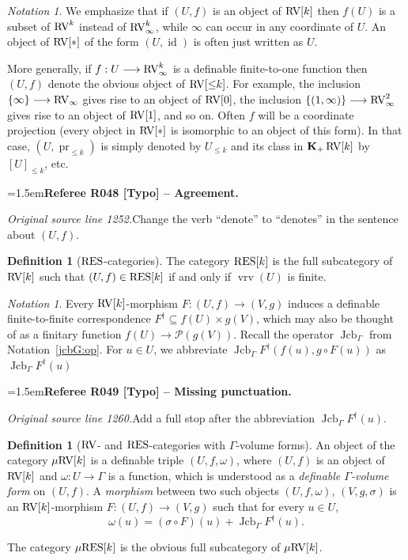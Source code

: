 \documentclass[12pt]{amsart}
\newcommand{\RefereeRemark}[4]{%
  \par\medskip\begingroup\normalfont\small\color{RefereePurple}%
  \emergencystretch=1.5em\noindent\textbf{Referee R#1 [#2] -- #3.}\par\nobreak\noindent #4\par
  \endgroup\medskip
}
\newcommand{\memph}[1]{{\color{magenta}\emph{#1}}}
\theoremstyle{plain}
\theoremstyle{definition}
\newtheorem{defn}[thm]{Definition}
\theoremstyle{remark}
\newtheorem{nota}[thm]{Notation}
\numberwithin{equation}{section}
\theoremstyle{plain}
\newcommand{\RV}{\textup{RV}}
\DeclareMathOperator{\id}{id}
\DeclareMathOperator{\pr}{pr}
\DeclareMathOperator{\jcb}{Jcb}
\newcommand{\0}{\emptyset}
\newcommand{\mdl}[1]{\mathcal{#1}}  %
\newcommand{\fun}{\longrightarrow}
\newcommand{\sub}{\subseteq}
\newcommand{\mgRV}{{\mu}{\RV}}
\newcommand{\RES}{\textup{RES}}
\newcommand{\mgRES}{{\mu}{\RES}}
\DeclareMathOperator{\gsk}{\mathbf{K}_+}
\DeclareMathOperator{\vrv}{vrv}
\begin{document}
\begin{nota}\label{0coor}
We emphasize that if $(U, f)$ is an object of $\RV[k]$ then $f(U)$ is a subset of $\RV^k$ instead of $\RV^k_\infty$, while $\infty$ can occur in any coordinate of $U$. An object of  $\RV[*]$ of the form $(U, \id)$ is often just written as $U$.

More generally, if $f : U \fun \RV_\infty^k$ is a definable finite-to-one function then $(U, f)$ denote the obvious object of $\RV[{\leq} k]$. For example, the inclusion $\{\infty\} \fun \RV_{\infty}$ gives rise to an object of $\RV[0]$, the inclusion $\{(1, \infty)\} \fun \RV_{\infty}^2$ gives rise to an object of $\RV[1]$, and so on. Often $f$ will be a coordinate projection (every object in $\RV[*]$ is isomorphic to an object of this form). In that case, $(U, \pr_{\leq k})$ is simply denoted by $U_{\leq k}$ and its class in $\gsk \RV[k]$ by $[U]_{\leq k}$, etc.

\RefereeRemark{048}{Typo}{Agreement}{%
\textit{Original source line 1252.}\quad Change the verb ``denote'' to ``denotes'' in the sentence about $(U,f)$.
}
\end{nota}

\begin{defn}[$\RES$-categories]\label{defn:RES:cat}
The category $\RES[k]$ is the full subcategory of $\RV[k]$ such that $(U, f) \in \RES[k]$ if and only if $\vrv(U)$ is finite.
\end{defn}

\begin{nota}\label{mor:ftf}
Every $\RV[k]$-morphism $F: (U, f) \fun (V, g)$  induces a definable finite-to-finite correspondence $F^\dag \sub f(U) \times g(V)$, which may also be thought of as a finitary function $f(U) \fun \mdl P(g(V))$. Recall the operator $\jcb_{\Gamma}$ from Notation~\ref{jcbG:op}. For $ u \in U$, we abbreviate $\jcb_{\Gamma}  F^\dag(f(u), g \circ F(u))$ as $\jcb_{\Gamma}  F^\dag(u)$

\RefereeRemark{049}{Typo}{Missing punctuation}{%
\textit{Original source line 1260.}\quad Add a full stop after the abbreviation $\jcb_{\Gamma}F^\dag(u)$.
}
\end{nota}



\begin{defn}[$\RV$- and $\RES$-categories with $\Gamma$-volume forms]\label{defn:RV:mu}
An object of the category $\mgRV[k]$ is a definable triple $(U, f, \omega)$, where $(U, f)$ is an object of $\RV[k]$ and $\omega : U \fun \Gamma$ is a function, which is understood as a \memph{definable $\Gamma$-volume form} on $(U, f)$. A \memph{morphism} between two such objects $(U,f, \omega)$, $(V, g, \sigma)$ is an $\RV[k]$-morphism $F: (U, f) \fun (V, g)$ such that for every $ u \in U$,
\begin{equation}\label{cond:mg2}
\omega(u) = (\sigma \circ F)(u) + \jcb_{\Gamma}  F^\dag(u).
\end{equation}

The category $\mgRES[k]$ is the obvious full subcategory of $\mgRV[k]$.
\end{defn}
\end{document}
